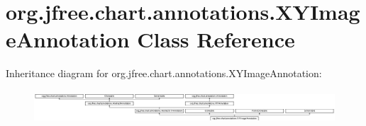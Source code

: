 \hypertarget{classorg_1_1jfree_1_1chart_1_1annotations_1_1_x_y_image_annotation}{}\section{org.\+jfree.\+chart.\+annotations.\+X\+Y\+Image\+Annotation Class Reference}
\label{classorg_1_1jfree_1_1chart_1_1annotations_1_1_x_y_image_annotation}
Inheritance diagram for org.\+jfree.\+chart.\+annotations.\+X\+Y\+Image\+Annotation\+:\begin{figure}[H]
\begin{center}
\leavevmode
\includegraphics[height=1.248607cm]{classorg_1_1jfree_1_1chart_1_1annotations_1_1_x_y_image_annotation}
\end{center}
\end{figure}
